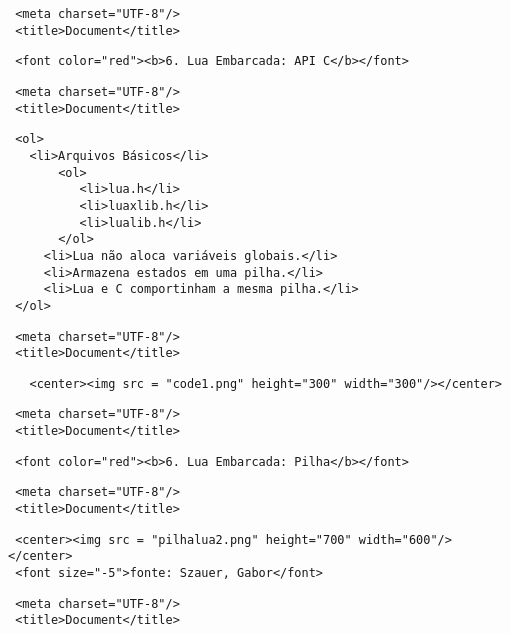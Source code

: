 \documentclass[11pt]{article}
\begin{document}
    \begin{verbatim}
 <meta charset="UTF-8"/>
 <title>Document</title>
\end{verbatim}

\begin{verbatim}
 <font color="red"><b>6. Lua Embarcada: API C</b></font>    
\end{verbatim}

    \begin{verbatim}
 <meta charset="UTF-8"/>
 <title>Document</title>
\end{verbatim}

\begin{verbatim}
 <ol>
   <li>Arquivos Básicos</li>
       <ol>
          <li>lua.h</li> 
          <li>luaxlib.h</li> 
          <li>lualib.h</li>
       </ol> 
     <li>Lua não aloca variáveis globais.</li>
     <li>Armazena estados em uma pilha.</li>
     <li>Lua e C comportinham a mesma pilha.</li>
 </ol>         
\end{verbatim}

    \begin{verbatim}
 <meta charset="UTF-8"/>
 <title>Document</title>
\end{verbatim}

\begin{verbatim}
   <center><img src = "code1.png" height="300" width="300"/></center>      
\end{verbatim}

    \begin{verbatim}
 <meta charset="UTF-8"/>
 <title>Document</title>
\end{verbatim}

\begin{verbatim}
 <font color="red"><b>6. Lua Embarcada: Pilha</b></font>    
\end{verbatim}

    \begin{verbatim}
 <meta charset="UTF-8"/>
 <title>Document</title>
\end{verbatim}

\begin{verbatim}
 <center><img src = "pilhalua2.png" height="700" width="600"/></center> 
 <font size="-5">fonte: Szauer, Gabor</font>
\end{verbatim}

    \begin{verbatim}
 <meta charset="UTF-8"/>
 <title>Document</title>
\end{verbatim}
\end{document}
